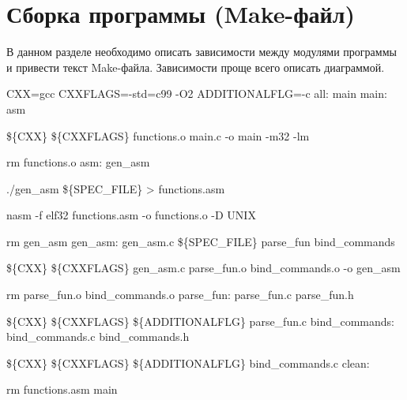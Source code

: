 \documentclass[a4paper,12pt,titlepage,finall]{article}
\begin{document}



\newpage

\section{Сборка программы (Make-файл)}

В данном разделе необходимо описать зависимости между модулями программы
и привести текст Make-файла. Зависимости проще всего описать диаграммой.

{\ttfamily
\noindent
CXX=gcc 
\newline
CXXFLAGS=-std=c99 -O2 
\newline
ADDITIONALFLG=-c
\newline
all: main
\newline
main: asm 
	
  \$\{CXX\} \$\{CXXFLAGS\} functions.o  main.c -o main -m32 -lm
	
  rm functions.o
\newline
asm: gen\_asm

  ./gen\_asm \$\{SPEC\_FILE\} > functions.asm

  nasm -f elf32 functions.asm -o functions.o -D UNIX
  
  rm gen\_asm
\newline
gen\_asm: gen\_asm.c \$\{SPEC\_FILE\} parse\_fun bind\_commands
	
  \$\{CXX\} \$\{CXXFLAGS\} gen\_asm.c parse\_fun.o bind\_commands.o -o gen\_asm
	
  rm parse\_fun.o bind\_commands.o
\newline
parse\_fun: parse\_fun.c parse\_fun.h
	
  \$\{CXX\} \$\{CXXFLAGS\} \$\{ADDITIONALFLG\} parse\_fun.c 
\newline
bind\_commands: bind\_commands.c bind\_commands.h
	
  \$\{CXX\} \$\{CXXFLAGS\} \$\{ADDITIONALFLG\} bind\_commands.c
\newline
clean: 

  rm functions.asm main 
}
\newpage
\end{document}
